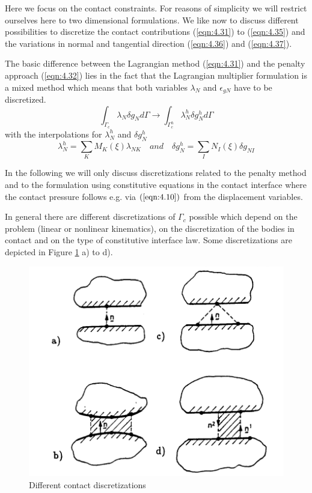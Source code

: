 Here we focus on the contact constraints. For reasons of simplicity we will restrict
ourselves here to two dimensional formulations. We like now to discuss diﬀerent possibilities to discretize the contact
contributions (\ref{eqn:4.31}) to (\ref{eqn:4.35}) and the variations in normal and tangential direction (\ref{eqn:4.36}) and (\ref{eqn:4.37}).

The basic diﬀerence between the Lagrangian method (\ref{eqn:4.31}) and the penalty approach (\ref{eqn:4.32})
lies in the fact that the Lagrangian multiplier formulation is a mixed method which means
that both variables $\lambda_N$ and $ \epsilon_{gN}$ have to be discretized.
\begin{equation}
 \int_{\Gamma_{\mathrm{c}}} \lambda_{N} \delta g_{N} d \Gamma \longrightarrow \int_{\Gamma_{c}^{h}} \lambda_{N}^{h} \delta g_{N}^{h} d \Gamma 
 \label{eqn:4.44}
\end{equation}
with the interpolations for $\lambda_{N}^{h}$ and $ \delta g_{N}^{h}$
\begin{equation}
 \lambda_{N}^{h}=\sum_{K} M_{K}(\xi) \lambda_{N K} \quad  \textit{and} \quad \delta g_{N}^{h}=\sum_{I} N_{I}(\xi) \delta g_{N I} 
\end{equation}

In the following we will only discuss discretizations related to the penalty method and
to the formulation using constitutive equations in the contact interface where the contact
pressure follows e.g. via $(\ref{eqn:4.10})$ from the displacement variables.

In general there are diﬀerent discretizations of $\Gamma_c$ possible which depend on the problem
(linear or nonlinear kinematics), on the discretization of the bodies in contact and on the
type of constitutive interface law. Some discretizations are depicted in Figure \ref{fig:abcd} a) to d).
\begin{figure}[H]
    \centering
    \includegraphics[scale=0.7]{Figure2/Chap4/abcd.png}
    \caption{Diﬀerent contact discretizations}
    \label{fig:abcd}
\end{figure}
